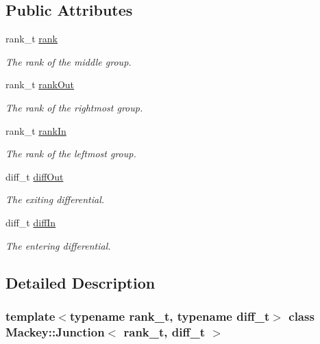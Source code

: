 \subsection*{Public Attributes}
\begin{DoxyCompactItemize}
\item 
rank\+\_\+t \hyperlink{classMackey_1_1Junction_a70d63a0f6ad20b052210ab0009815a9e}{rank}
\begin{DoxyCompactList}\small\item\em The rank of the middle group. \end{DoxyCompactList}\item 
rank\+\_\+t \hyperlink{classMackey_1_1Junction_afe400bc60b84966b933fd57c11400607}{rank\+Out}
\begin{DoxyCompactList}\small\item\em The rank of the rightmost group. \end{DoxyCompactList}\item 
rank\+\_\+t \hyperlink{classMackey_1_1Junction_a6174a3bef929f4b5b892d3b7ccb20528}{rank\+In}
\begin{DoxyCompactList}\small\item\em The rank of the leftmost group. \end{DoxyCompactList}\item 
diff\+\_\+t \hyperlink{classMackey_1_1Junction_a909fce095bc4647a312d6b10480b2d9a}{diff\+Out}
\begin{DoxyCompactList}\small\item\em The exiting differential. \end{DoxyCompactList}\item 
diff\+\_\+t \hyperlink{classMackey_1_1Junction_a581e0d7b62b7bf380d68936a79828cfc}{diff\+In}
\begin{DoxyCompactList}\small\item\em The entering differential. \end{DoxyCompactList}\end{DoxyCompactItemize}


\subsection{Detailed Description}
\subsubsection*{template$<$typename rank\+\_\+t, typename diff\+\_\+t$>$\newline
class Mackey\+::\+Junction$<$ rank\+\_\+t, diff\+\_\+t $>$}

